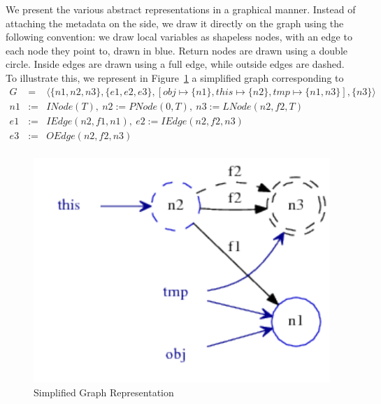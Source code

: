 We present the various abstract representations in a graphical manner. Instead
of attaching the metadata on the side, we draw it directly on the graph using
the following convention: we draw local variables as shapeless nodes, with an
edge to each node they point to, drawn in blue. Return nodes are drawn using
a double circle. Inside edges are drawn using a full edge, while
outside edges are dashed. To illustrate this, we represent in
Figure~\ref{fig:pt:graph1} a simplified graph corresponding to %
\begin{eqnarray*}
    G &=& \langle \{n1, n2, n3 \}, \{ e1, e2, e3 \}, [ obj \mapsto \{n1\}, this \mapsto \{n2\}, tmp \mapsto \{ n1, n3 \} ], \{n3\} \rangle  \\
    n1 &:=& INode(T),~  n2 := PNode(0, T),~ n3 := LNode(n2, f2, T) \\
    e1 &:=& IEdge(n2, f1, n1),~ e2 := IEdge(n2, f2, n3) \\
    e3 &:=& OEdge(n2, f2, n3) \\
\end{eqnarray*}

\begin{figure}[h]
    \centering

    \includegraphics{images/pt_graph1}

    \caption{Simplified Graph Representation}
    \label{fig:pt:graph1}
\end{figure}

